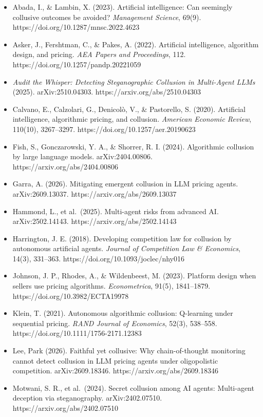 \documentclass[11pt,a4paper]{article}
\providecommand{\tightlist}{\setlength{\itemsep}{1pt}\setlength{\parskip}{0pt}}
\begin{document}
\begin{itemize}
\tightlist
\item
  Abada, I., \& Lambin, X. (2023). Artificial intelligence: Can seemingly collusive outcomes be avoided? \emph{Management Science}, 69(9). https://doi.org/10.1287/mnsc.2022.4623
\item
  Asker, J., Fershtman, C., \& Pakes, A. (2022). Artificial intelligence, algorithm design, and pricing. \emph{AEA Papers and Proceedings}, 112. https://doi.org/10.1257/pandp.20221059
\item
  \emph{Audit the Whisper: Detecting Steganographic Collusion in Multi-Agent LLMs} (2025). arXiv:2510.04303. https://arxiv.org/abs/2510.04303
\item
  Calvano, E., Calzolari, G., Denicolò, V., \& Pastorello, S. (2020). Artificial intelligence, algorithmic pricing, and collusion. \emph{American Economic Review}, 110(10), 3267--3297. https://doi.org/10.1257/aer.20190623
\item
  Fish, S., Gonczarowski, Y. A., \& Shorrer, R. I. (2024). Algorithmic collusion by large language models. arXiv:2404.00806. https://arxiv.org/abs/2404.00806
\item
  Garra, A. (2026). Mitigating emergent collusion in LLM pricing agents. arXiv:2609.13037. https://arxiv.org/abs/2609.13037
\item
  Hammond, L., et al.~(2025). Multi-agent risks from advanced AI. arXiv:2502.14143. https://arxiv.org/abs/2502.14143
\item
  Harrington, J. E. (2018). Developing competition law for collusion by autonomous artificial agents. \emph{Journal of Competition Law \& Economics}, 14(3), 331--363. https://doi.org/10.1093/joclec/nhy016
\item
  Johnson, J. P., Rhodes, A., \& Wildenbeest, M. (2023). Platform design when sellers use pricing algorithms. \emph{Econometrica}, 91(5), 1841--1879. https://doi.org/10.3982/ECTA19978
\item
  Klein, T. (2021). Autonomous algorithmic collusion: Q-learning under sequential pricing. \emph{RAND Journal of Economics}, 52(3), 538--558. https://doi.org/10.1111/1756-2171.12383
\item
  Lee, Park (2026). Faithful yet collusive: Why chain-of-thought monitoring cannot detect collusion in LLM pricing agents under oligopolistic competition. arXiv:2609.18346. https://arxiv.org/abs/2609.18346
\item
  Motwani, S. R., et al.~(2024). Secret collusion among AI agents: Multi-agent deception via steganography. arXiv:2402.07510. https://arxiv.org/abs/2402.07510
\end{itemize}
\end{document}
